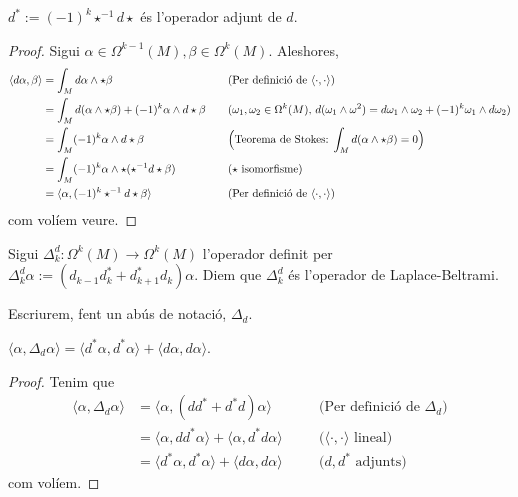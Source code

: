 \begin{lema}
    $d^{*}:=(-1)^{k}\star^{-1}d\star$ és l'operador adjunt de $d$.
    \begin{proof}
        Sigui $\alpha\in\Omega^{k-1}(M),\beta\in\Omega^{k}(M)$. Aleshores,
        \begin{align*}
            \langle d\alpha,\beta\rangle
            &=\int_{M}d\alpha\wedge\star\beta
            &\quad&\textrm{(Per definició de $\langle\cdot,\cdot\rangle$)}\\
            &=\int_{M}d(\alpha\wedge\star\beta)+(-1)^{k}\alpha\wedge d\star\beta
            &\quad&\textrm{($\omega_{1},\omega_{2}\in\Omega^{k}(M)$, $d(\omega_{1}\wedge\omega^{2})=d\omega_{1}\wedge\omega_{2}+(-1)^{k}\omega_{1}\wedge d\omega_{2}$)}\\
            &=\int_{M}(-1)^{k}\alpha\wedge d\star\beta
            &\quad&\textrm{\Big(Teorema de Stokes: $\int_{M}d(\alpha\wedge\star\beta)=0$\Big)}\\
            &=\int_{M}(-1)^{k}\alpha\wedge\star(\star^{-1}d\star\beta)
            &\quad&\textrm{($\star$ isomorfisme)}\\
            &=\langle\alpha,(-1)^{k}\star^{-1}d\star\beta\rangle
            &\quad&\textrm{(Per definició de $\langle\cdot,\cdot\rangle$)}
        \end{align*}
        com volíem veure.
    \end{proof}
\end{lema}
\begin{definicio}
    Sigui $\Delta_{k}^{d}:\Omega^{k}(M)\rightarrow\Omega^{k}(M)$ l'operador definit per $\Delta_{k}^{d}\alpha:=(d_{k-1}d_{k}^{*}+d_{k+1}^{*}d_{k})\alpha$. Diem que $\Delta_{k}^{d}$ és l'operador de Laplace-Beltrami.
\end{definicio}
Escriurem, fent un abús de notació, $\Delta_{d}$.
\begin{lema}
    $\langle\alpha,\Delta_{d}\alpha\rangle=\langle d^{*}\alpha,d^{*}\alpha\rangle
    +\langle d\alpha,d\alpha\rangle$.
    \begin{proof}
        Tenim que
        \begin{align*}
            \langle\alpha,\Delta_{d}\alpha\rangle
            &=\langle\alpha,(dd^{*}+d^{*}d)\alpha\rangle
            &\quad&\textrm{(Per definició de $\Delta_{d}$)}\\
            &=\langle\alpha,dd^{*}\alpha\rangle
            +\langle\alpha,d^{*}d\alpha\rangle
            &\quad&\textrm{($\langle\cdot,\cdot\rangle$ lineal)}\\
            &=\langle d^{*}\alpha,d^{*}\alpha\rangle
            +\langle d\alpha,d\alpha\rangle
            &\quad&\textrm{($d,d^{*}$ adjunts)}
        \end{align*}
        com volíem.
    \end{proof}
\end{lema}
